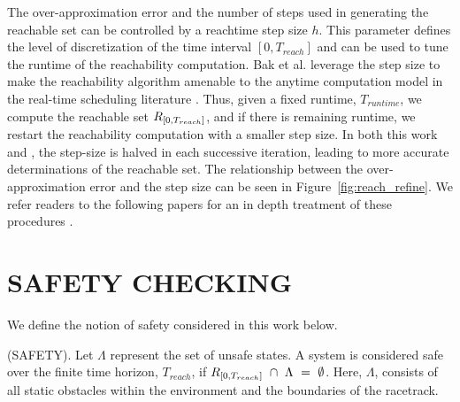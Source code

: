 \documentclass[manuscript,screen,review]{acmart}
\newcommand{\figref}[1]{Figure~\ref{#1}}
\begin{document}
The over-approximation error and the number of steps used in generating the reachable set can be controlled by a reachtime step size $h$. This parameter defines the level of discretization of the time interval $[0,T_{reach}]$ and can be used to tune the runtime of the reachability computation. Bak et al. leverage the step size to make the reachability algorithm amenable to the anytime computation model in the real-time scheduling literature \cite{Liu1991}. Thus, given a fixed runtime, $T_{runtime}$, we compute the reachable set $\mathnormal{R}_{[0,T_{reach}]}$, and if there is remaining runtime, we restart the reachability computation with a smaller step size. In both this work and \cite{Bak2014}, the step-size is halved in each successive iteration, leading to more accurate determinations of the reachable set. The relationship between the over-approximation error and the step size can be seen in \figref{fig:reach_refine}. We refer readers to the following papers for an in depth treatment of these procedures \cite{dang2000,Bak2014,Johnson2016}.










\section{SAFETY CHECKING}

We define the notion of safety considered in this work below. \smallskip
\begin{definition}%
(SAFETY). Let $\Lambda$ represent the set of unsafe states. A system is considered safe over the finite time horizon, $T_{reach}$, if  $\mathnormal{R}_{[0,T_{reach}]} \  \cap \ \Lambda \ = \ \emptyset$. Here, $\Lambda$, consists of all static obstacles within the environment and the boundaries of the racetrack.
\end{definition}%
\end{document}
